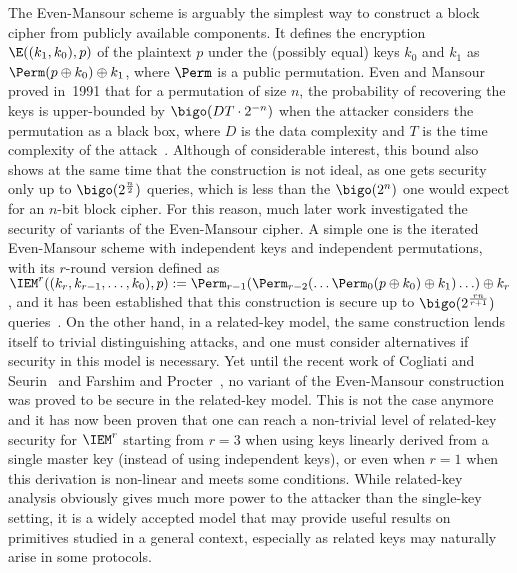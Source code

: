 The Even-Mansour scheme is arguably the simplest way to construct a block cipher from publicly available
components. It defines the encryption $\E((k_1, k_0), p)$ of the plaintext $p$ under the (possibly equal) keys $k_0$
and $k_1$ as $\Perm(p \oplus k_0) \oplus k_1$, where $\Perm$ is a public permutation. Even and Mansour proved
in~1991 that for a permutation of size $n$, the probability of recovering the keys
is upper-bounded by $\bigo(DT \cdot 2^{-n})$ when the attacker considers the permutation as a black box,
where $D$ is the data complexity and $T$ is the time
complexity of the attack~\cite{EM}. Although
of considerable interest, this bound also shows at the same time that the construction is not ideal,
as one gets security only up to $\bigo(2^\frac{n}{2})$ queries, which
is less than the $\bigo(2^n)$ one would expect for an $n$-bit block cipher. For this
reason, much later work investigated the security of variants of the Even-Mansour cipher. A simple
one is the iterated Even-Mansour scheme with independent keys and independent permutations,
with its $r$-round version defined as
$\IEM^r((k_r, k_{r-1}, \ldots, k_0), p) := \Perm_{r-1}(\Perm_{r-2}(\ldots\Perm_0\linebreak[1](p \oplus k_0) \oplus k_1)\ldots) \oplus k_r$,
and it has been established that this construction is secure up to $\bigo(2^\frac{rn}{r+1})$ queries~\cite{CS14}.
On the other hand, in a related-key model, the same construction lends itself to trivial
distinguishing attacks, and one must consider alternatives if security in this model is necessary.
Yet until the recent work of Cogliati and Seurin~\cite{CS15} and Farshim and Procter~\cite{FP14},
no variant of the Even-Mansour construction was proved to be secure in the related-key model. This is not the case
anymore and it has now been proven that one can reach a non-trivial level of related-key security for $\IEM^r$
starting from $r = 3$ when using keys linearly derived from a single master key (instead
of using independent keys), or even when $r = 1$
when this derivation is non-linear and meets some conditions.
While related-key analysis obviously gives much more power to the attacker than the
single-key setting, it is a widely accepted
model that may provide useful results on primitives studied in a general context,
especially as related keys may naturally arise in some protocols.

